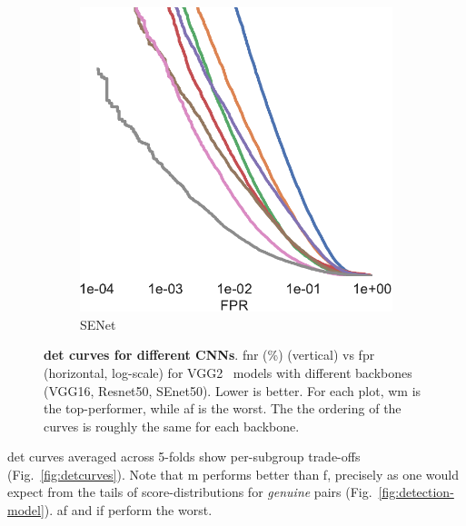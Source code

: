 \documentclass[10pt,twocolumn,letterpaper]{article}
\begin{document}
\begin{figure}[h!]
\begin{subfigure}[t]{.27\linewidth}
    \includegraphics[width=.75\linewidth]{figures/curve_senet50_subgroups-crop.pdf}
    \caption{SENet~\cite{hu2018squeeze}}
    \end{subfigure}
    \caption{\small{\textbf{\gls{det} curves for different CNNs}. \gls{fnr} (\%) (vertical) vs \gls{fpr}  (horizontal, log-scale) for VGG2~\cite{Cao18} models with different backbones (VGG16, Resnet50, SEnet50). Lower is better. For each plot, \gls{wm} is the top-performer, while \gls{af} is the worst. The the ordering of the curves is roughly the same for each backbone.}}\label{fig:sdm-appendix-a}
\end{figure}




\gls{det} curves averaged across 5-folds show per-subgroup trade-offs (Fig.~\ref{fig:detcurves}). Note that \gls{m} performs better than \gls{f}, precisely as one would expect from the tails of score-distributions for \emph{genuine} pairs (Fig.~\ref{fig:detection-model}). \Gls{af} and \gls{if} perform the worst.
\end{document}
